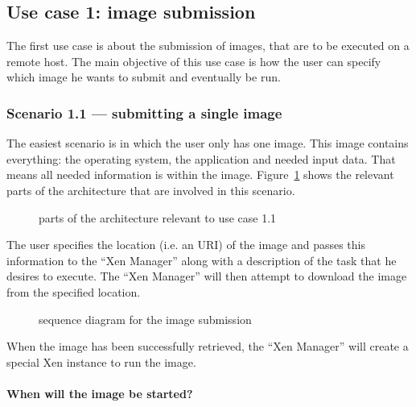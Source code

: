 \subsection{Use case 1: image submission}
\label{uc:1}

The  first use case  is about  the submission  of images,  that are  to be
executed on a remote host. The main  objective of this use case is how the
user can specify which image he wants to submit and eventually be run.

\subsubsection{Scenario 1.1 --- submitting a single image}

The easiest scenario  is in which the user only has  one image. This image
contains  everything: the  operating  system, the  application and  needed
input  data.  That  means  all needed  information  is within  the image.  
Figure~\ref{fig:arch-uc-1.1} shows the  relevant parts of the architecture
that are involved in this scenario.

\begin{figure}[htbp]
  \begin{center}
  \end{center}
  \caption[Architecture UC 1.1]{parts of the architecture relevant to use
    case 1.1}
  \label{fig:arch-uc-1.1}
\end{figure}

The user specifies the location (i.e. an URI) of the image and passes this
information to  the ``Xen Manager'' along  with a description  of the task
that  he desires  to execute.  The ``Xen  Manager'' will  then  attempt to
download the  image from the  specified location. 

\begin{figure}[htbp]
  \begin{center}
  \end{center}
  \caption[Sequence UC 1.1]{sequence diagram for the image submission}
  \label{fig:seq-uc-1.1}
\end{figure}

When the image  has been successfully retrieved, the  ``Xen Manager'' will
create  a  special  Xen  instance  to  run the  image.

\bigskip

\paragraph*{When will the image be started?}

